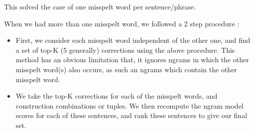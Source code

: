 This solved the case of one misspelt word per sentence/phrase. 

When we had more than one misspelt word, we followed a 2 step procedure :

\begin{itemize}
\item First, we consider each misspelt word independent of the other one, and find a set of top-K (5 generally) corrections using the above procedure. This method has an obvious limitation that, it ignores ngrams in which the other misspelt word(s) also occurs, as such an ngrams which contain the other misspelt word.
\item We take the top-K corrections for each of the misspelt words, and construction combinations or tuples. We then recompute the ngram model scores for each of these sentences, and rank these sentences to give our final set.
\end{itemize}

